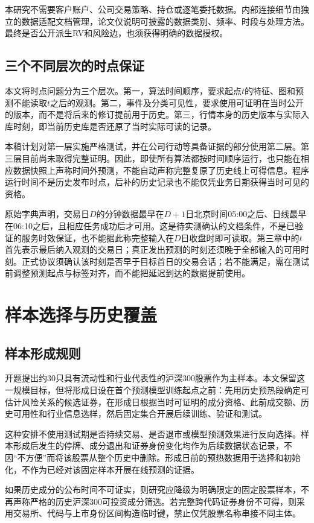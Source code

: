 本研究不需要客户账户、公司交易策略、持仓或逐笔委托数据。内部连接细节由独立的数据适配文档管理，论文仅说明可披露的数据类别、频率、时段与处理方法。最终是否公开派生RV和风险边，也须获得明确的数据授权。

\subsection{三个不同层次的时点保证}
本文将时点问题分为三个层次。第一，算法时间顺序，要求起点$t$的特征、图和预测不能读取$t$之后的观测。第二，事件及分类可见性，要求使用可证明在当时公开的版本，而不是将后来的修订提前用于历史。第三，行情本身的历史版本与实际入库时刻，即当前历史库是否还原了当时实际可读的记录。

本稿计划对第一层实施严格测试，并在公司行动等具备证据的部分使用第二层。第三层目前尚未取得完整证明。因此，即使所有算法都按时间顺序运行，也只能在相应数据快照上声称时间外预测，不能自动声称完整复原了历史线上可得信息。程序运行时间不是历史发布时点，后补的历史记录也不能仅凭业务日期获得当时可见的资格。

原始字典声明，交易日$D$的分钟数据最早在$D+1$日北京时间05:00之后、日线最早在06:10之后，且相应任务成功后才可用。这是待实测确认的文档条件，不是已验证的服务时效保证，也不能据此称完整输入在$D$日收盘时即可读取。第三章中的$t$首先表示最后纳入观测的交易日；真正发出预测的时刻还须晚于全部输入的可用时刻。正式协议须确认该时刻是否早于目标首日的交易会话；若不能满足，需在测试前调整预测起点与标签对齐，而不能把延迟到达的数据提前使用。

\section{样本选择与历史覆盖}
\subsection{样本形成规则}
开题提出约30只具有流动性和行业代表性的沪深300股票作为主样本。本文保留这一规模目标，但将形成日设在首个预测模型训练起点之前：先用历史预热段确定可估计风险关系的候选证券，在形成日根据当时可证明的成分资格、此前成交额、历史可用性和行业信息选样，然后固定集合开展后续训练、验证和测试。

这种安排不使用测试期是否持续交易、是否退市或模型预测效果进行反向选择。样本形成后发生的停牌、成分退出和证券身份变化均作为后续数据状态记录，不因“不方便”而将该股票从整个历史中删除。形成日前的预热数据用于选择和初始化，不作为已经对该固定样本开展在线预测的证据。

如果历史成分的公布时间不可证实，则研究应降级为明确限定的固定股票样本，不再声称严格的历史沪深300可投资成分筛选。若完整跨代码证券身份不可得，则采用交易所、代码与上市身份区间构造临时键，禁止仅凭股票名称串接不同主体。

